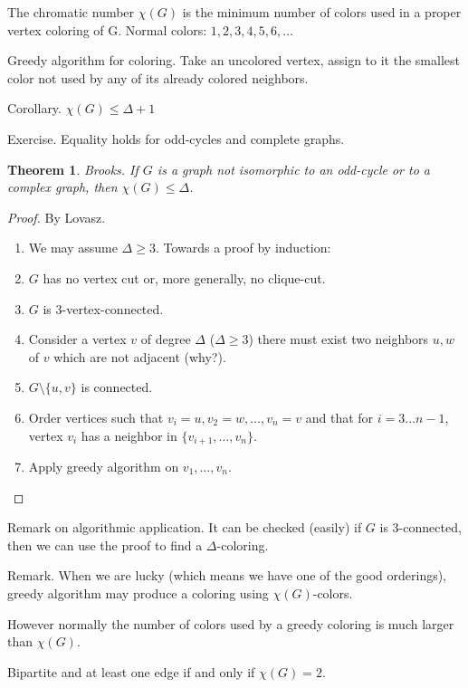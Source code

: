 \documentclass[12pt,a4paper]{article}
\newtheorem{theorem}{Theorem}
\begin{document}
The chromatic number \(\chi(G)\) is the minimum number of colors used in a
proper vertex coloring of G. Normal colors: \(1, 2, 3, 4, 5, 6, \dots\)

Greedy algorithm for coloring.  Take an uncolored vertex, assign to it the
smallest color not used by any of its already colored neighbors.

Corollary. \(\chi(G) \leq \Delta + 1\)

Exercise. Equality holds for odd-cycles and complete graphs.

\begin{theorem}
  Brooks.  If \(G\) is a graph not isomorphic to an odd-cycle or to a complex
  graph, then \(\chi(G) \leq \Delta\).
\end{theorem}

\begin{proof}
  By Lovasz.

  \begin{enumerate}
  \item We may assume \(\Delta \geq 3\). Towards a proof by induction:
  \item \(G\) has no vertex cut or, more generally, no clique-cut.
  \item \(G\) is \(3\)-vertex-connected.
  \item Consider a vertex \(v\) of degree \(\Delta\) (\(\Delta \geq 3\)) there
    must exist two neighbors \(u, w\) of \(v\) which are not adjacent (why?).
  \item \(G \setminus \{u, v\}\) is connected.
  \item Order vertices such that \(v_i=u, v_2=w, \dots, v_n=v\) and that for
    \(i=3 \dots n-1\), vertex \(v_i\) has a neighbor in
    \(\{v_{i+1}, \dots, v_n\}\).
  \item Apply greedy algorithm on \(v_1, \dots, v_n\).
  \end{enumerate}
\end{proof}

Remark on algorithmic application. It can be checked (easily) if \(G\) is
3-connected, then we can use the proof to find a \(\Delta\)-coloring.

Remark. When we are lucky (which means we have one of the good orderings),
greedy algorithm may produce a coloring using \(\chi(G)\)-colors.

However normally the number of colors used by a greedy coloring is much larger
than \(\chi(G)\).

Bipartite and at least one edge if and only if \(\chi(G)=2\).
\end{document}
